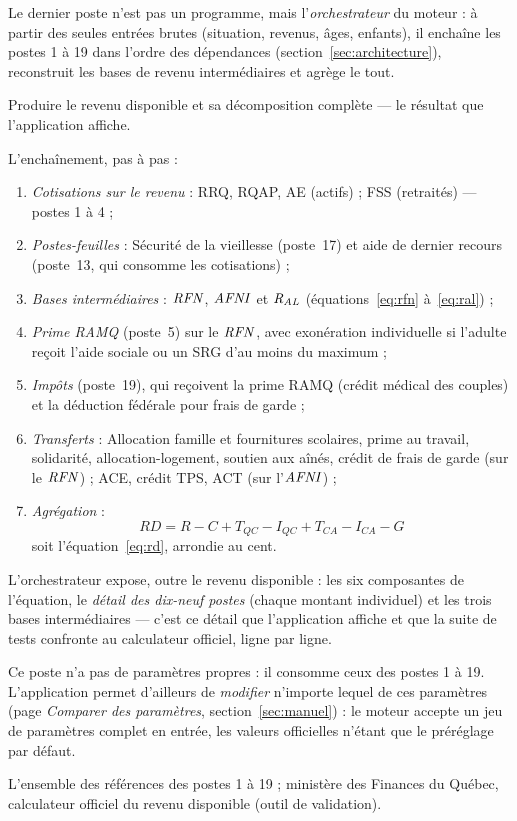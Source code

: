 
\pdesc Le dernier poste n'est pas un programme, mais l'\emph{orchestrateur}
du moteur : à partir des seules entrées brutes (situation, revenus, âges,
enfants), il enchaîne les postes 1 à 19 dans l'ordre des dépendances
(section~\ref{sec:architecture}), reconstruit les bases de revenu
intermédiaires et agrège le tout.

\pobj Produire le revenu disponible et sa décomposition complète --- le
résultat que l'application affiche.

\pregle L'enchaînement, pas à pas :
\begin{enumerate}
  \item \emph{Cotisations sur le revenu} : RRQ, RQAP, AE (actifs) ; FSS
        (retraités) --- postes 1 à 4 ;
  \item \emph{Postes-feuilles} : Sécurité de la vieillesse (poste~17) et
        aide de dernier recours (poste~13, qui consomme les cotisations) ;
  \item \emph{Bases intermédiaires} : $\mathit{RFN}$, $\mathit{AFNI}$ et $\mathit{R_{AL}}$
        (équations~\ref{eq:rfn} à~\ref{eq:ral}) ;
  \item \emph{Prime RAMQ} (poste~5) sur le $\mathit{RFN}$, avec exonération
        individuelle si l'adulte reçoit l'aide sociale ou un SRG d'au
        moins  du maximum ;
  \item \emph{Impôts} (poste~19), qui reçoivent la prime RAMQ (crédit
        médical des couples) et la déduction fédérale pour frais de
        garde ;
  \item \emph{Transferts} : Allocation famille et fournitures scolaires,
        prime au travail, solidarité, allocation-logement, soutien aux
        aînés, crédit de frais de garde (sur le $\mathit{RFN}$) ; ACE, crédit TPS,
        ACT (sur l'$\mathit{AFNI}$) ;
  \item \emph{Agrégation} :
        \[
        RD = R - C + T_{QC} - I_{QC} + T_{CA} - I_{CA} - G
        \]
        soit l'équation~\ref{eq:rd}, arrondie au cent.
\end{enumerate}

L'orchestrateur expose, outre le revenu disponible : les six composantes de
l'équation, le \emph{détail des dix-neuf postes} (chaque montant
individuel) et les trois bases intermédiaires --- c'est ce détail que
l'application affiche et que la suite de tests confronte au calculateur
officiel, ligne par ligne.

\pparams Ce poste n'a pas de paramètres propres : il consomme ceux des
postes 1 à 19. L'application permet d'ailleurs de \emph{modifier} n'importe
lequel de ces paramètres (page \emph{Comparer des paramètres},
section~\ref{sec:manuel}) : le moteur accepte un jeu de paramètres complet
en entrée, les valeurs officielles n'étant que le préréglage par défaut.



\prefs L'ensemble des références des postes 1 à 19 ; ministère des
Finances du Québec, calculateur officiel du revenu disponible (outil de
validation).
